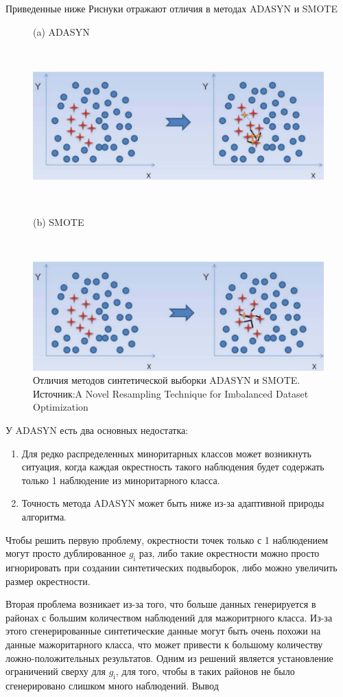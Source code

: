 \documentclass[12pt,a4paper, oneside]{extreport}
\begin{document}
Приведенные ниже Риснуки отражают отличия в  методах ADASYN  и  SMOTE

\begin{figure}[H]
	\centering
	(a) ADASYN
	
	\
	
	\includegraphics[width=0.7\linewidth]{screenshot008}
	
	\
	
	(b) SMOTE
	
	\
	
	\includegraphics[width=0.7\linewidth]{screenshot009}
	\caption{Отличия  методов синтетической выборки  ADASYN  и  SMOTE. Источник:A Novel Resampling Technique for Imbalanced Dataset Optimization}
		
	
	\label{fig:screenshot008}
\end{figure}



У ADASYN есть два основных недостатка:
\begin{enumerate}
	\item Для редко распределенных миноритарных  классов  может возникнуть ситуация, когда каждая окрестность такого наблюдения будет содержать только 1 наблюдение из   миноритарного  класса.
	\item  Точность метода ADASYN может быть ниже из-за адаптивной природы алгоритма.
\end{enumerate}

Чтобы решить первую проблему, окрестности точек только с 1 наблюдением могут просто дублированное $g_{\mathrm{i}}$  раз, либо такие окрестности можно просто игнорировать при создании синтетических подвыборок, либо можно увеличить размер окрестности.

Вторая проблема возникает из-за того, что больше данных генерируется в районах с большим количеством наблюдений  для мажоритрного класса. Из-за этого сгенерированные синтетические данные могут быть очень похожи на данные мажоритарного  класса, что может привести к большому количеству ложно-положительных результатов. Одним из решений является установление ограничений сверху для $g_{\mathrm{i}}$, для того, чтобы в таких районов не было  сгенерировано слишком много наблюдений.
Вывод
\end{document}
